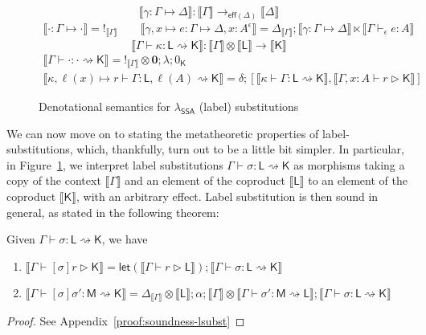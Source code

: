 \documentclass[acmsmall,screen,review]{acmart}
\newcommand{\mb}[1]{\ensuremath{\mathbf{#1}}}
\newcommand{\ms}[1]{\ensuremath{\mathsf{#1}}}
\newcommand{\thyp}[3]{#1 : {#2}^{#3}}
\newcommand{\bhyp}[2]{#1 : #2}
\newcommand{\hasty}[4]{#1 \vdash_{#2} #3: {#4}}
\newcommand{\haslb}[3]{#1 \vdash #2 \rhd #3}
\newcommand{\issubst}[3]{#1: #2 \mapsto #3}
\newcommand{\lbsubst}[4]{#1 \vdash #2: #3 \rightsquigarrow #4}
\newcommand{\dnt}[1]{\llbracket{#1}\rrbracket}
\newcommand{\tmor}[1]{{!}_{#1}}
\newcommand{\dmor}[1]{{\Delta}_{#1}}
\newcommand{\lmor}[1]{\ms{let}(#1)}
\newcommand{\isotopessa}{\(\lambda_{\ms{SSA}}\)}
\begin{document}
\begin{figure}
  \begin{equation*}
    \boxed{\dnt{\issubst{\gamma}{\Gamma}{\Delta}} 
      : \dnt{\Gamma} \to_{\ms{eff}(\Delta)} \dnt{\Delta}}
  \end{equation*}
  \begin{gather*}
    \dnt{\issubst{\cdot}{\Gamma}{\cdot}} = \tmor{\dnt{\Gamma}}
    \qquad
    \dnt{\issubst{\gamma, x \mapsto e}{\Gamma}{\Delta, \thyp{x}{A}{\epsilon}}}
    = \dmor{\dnt{\Gamma}};\dnt{\issubst{\gamma}{\Gamma}{\Delta}} 
      \ltimes \dnt{\hasty{\Gamma}{\epsilon}{e}{A}}
  \end{gather*}
  \begin{equation*}
    \boxed{\dnt{\lbsubst{\Gamma}{\kappa}{\ms{L}}{\ms{K}}} 
      : \dnt{\Gamma} \otimes \dnt{\ms{L}} \to \dnt{\ms{K}}}
  \end{equation*}
  \begin{gather*}
    \dnt{\lbsubst{\Gamma}{\cdot}{\cdot}{\ms{K}}} 
      = \tmor{\dnt{\Gamma}} \otimes \mb{0}; \lambda; 0_{\ms{K}}
    \\
    \dnt{\lbsubst{\kappa, \ell(x) \mapsto r}{\Gamma}{\ms{L}, \ell(A)}{\ms{K}}}
      = \delta ; [
      \dnt{\lbsubst{\kappa}{\Gamma}{\ms{L}}{\ms{K}}}, 
      \dnt{\haslb{\Gamma, \bhyp{x}{A}}{r}{\ms{K}}}
    ]
  \end{gather*}
  \caption{Denotational semantics for \isotopessa{} (label) substitutions}
  \Description{}
  \label{fig:ssa-subst-sem} 
\end{figure}

We can now move on to stating the metatheoretic properties of label-substitutions, which,
thankfully, turn out to be a little bit simpler. In particular, in Figure~\ref{fig:ssa-subst-sem},
we interpret label substitutions $\lbsubst{\Gamma}{\sigma}{\ms{L}}{\ms{K}}$ as morphisms taking
a copy of the context $\dnt{\Gamma}$ and an element of the coproduct $\dnt{\ms{L}}$ to an element
of the coproduct $\dnt{\ms{K}}$, with an arbitrary effect. Label substitution is then sound in
general, as stated in the following theorem:
\begin{theorem}[name=Soundness (Label Substitution), restate=soundnesslsubst]
  Given $\lbsubst{\Gamma}{\sigma}{\ms{L}}{\ms{K}}$, we have
  \begin{enumerate}[label=(\alph*)]
    \item $\dnt{\haslb{\Gamma}{[\sigma]r}{\ms{K}}}
      = \lmor{\dnt{\haslb{\Gamma}{r}{\ms{L}}}}
      ; \dnt{\lbsubst{\Gamma}{\sigma}{\ms{L}}{\ms{K}}}$
    \item $\dnt{\lbsubst{\Gamma}{[\sigma]\sigma'}{\ms{M}}{\ms{K}}}
      = \dmor{\dnt{\Gamma}} \otimes \dnt{\ms{L}} ; \alpha
      ; \dnt{\Gamma} \otimes \dnt{\lbsubst{\Gamma}{\sigma'}{\ms{M}}{\ms{L}}}
      ; \dnt{\lbsubst{\Gamma}{\sigma}{\ms{L}}{\ms{K}}}$
  \end{enumerate}
\end{theorem}
\begin{proof}
  See Appendix~\ref{proof:soundness-lsubst}
\end{proof}
\end{document}
